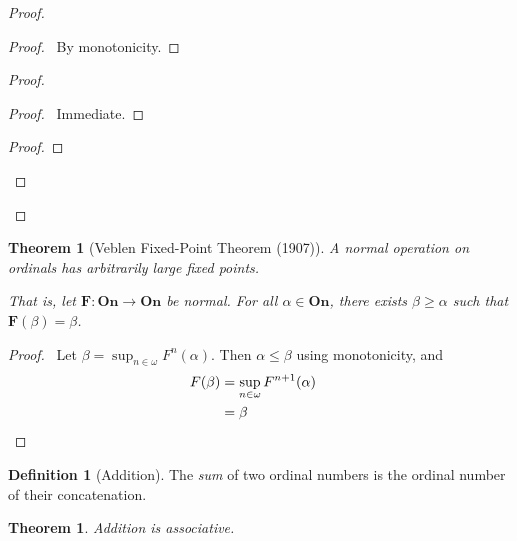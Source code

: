 \documentclass{article}
\let\qed\relax
\newtheorem{theorem}[axiom]{Theorem}
\theoremstyle{definition}
\newtheorem{definition}[axiom]{Definition}
\begin{document}
    \begin{proof}
        \pf
        \begin{proof}
            \pf\ By monotonicity.
        \end{proof}
        \begin{proof}
            \begin{proof}
                \pf\ Immediate.
            \end{proof}
            \begin{proof}
            \end{proof}
        \end{proof}
        \qed
    \end{proof}

    \begin{theorem}[Veblen Fixed-Point Theorem (1907)]
        A normal operation on ordinals has arbitrarily large fixed points.

        That is, let $\mathbf{F} : \mathbf{On} \rightarrow \mathbf{On}$ be normal. For all $\alpha \in
        \mathbf{On}$, there exists $\beta \geq \alpha$ such that $\mathbf{F}(\beta) = \beta$.
    \end{theorem}

    \begin{proof}
        \pf\ Let $\beta = \sup_{n \in \omega} F^n(\alpha)$. Then $\alpha \leq \beta$ using monotonicity,
        and
        \begin{align*}
            F(\beta) & = \sup_{n \in \omega} F^{n+1}(\alpha) \\
            & = \beta & \qed
        \end{align*}
    \end{proof}

    \begin{definition}[Addition]
        The \emph{sum} of two ordinal numbers is the ordinal number of their concatenation.
    \end{definition}

    \begin{theorem}
        Addition is associative.
    \end{theorem}
\end{document}
